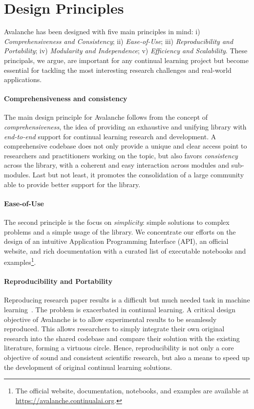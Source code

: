 \documentclass[final]{cvpr}
\theoremstyle{definition}
\begin{document}
\section{Design Principles}
\label{sec:principles}

Avalanche has been designed with five main principles in mind: i) \emph{Comprehensiveness and Consistency}; ii) \emph{Ease-of-Use}; iii) \emph{Reproducibility and Portability}; iv) \emph{Modularity and Independence}; v) \emph{Efficiency and Scalability}. These principals, we argue, are important for any continual learning project but become essential for tackling the most interesting research challenges and real-world applications.

\paragraph{Comprehensiveness and consistency} The main design principle for Avalanche follows from the concept of \emph{comprehensiveness}, the idea of providing %
an exhaustive
and unifying library with \emph{end-to-end} support for continual learning research and development. A comprehensive codebase does not only provide a unique and clear access point to researchers and practitioners working on the topic, but also favors \emph{consistency} across the library,  with a coherent and easy interaction across modules and sub-modules. Last but not least, it promotes the consolidation of a large community able to provide better support for the library.

\paragraph{Ease-of-Use} The second principle is the focus on \emph{simplicity}: simple solutions to complex problems and a simple usage of the library. We concentrate our efforts on the design of an intuitive Application Programming Interface (API), an official website, and rich documentation with a curated list of executable notebooks and examples\footnote{The official website, documentation, notebooks, and examples are available at \url{https://avalanche.continualai.org}.}.

\paragraph{Reproducibility and Portability} Reproducing research paper results is a difficult but much needed task in machine learning~\cite{hutson2018artificial}. The problem is exacerbated in continual learning. A critical design objective of Avalanche is to allow experimental results to be seamlessly reproduced. This allows researchers to simply integrate their own original research into the shared codebase and compare their solution with the existing literature, forming a virtuous circle. Hence, reproducibility is not only a core objective of sound and consistent scientific research, but also a means to speed up the development of original continual learning solutions.
\end{document}
